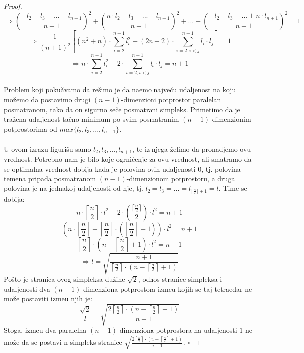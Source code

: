 \documentclass[11pt,letter]{article}
\begin{document}
\begin{proof}
$$\Rightarrow \left(\frac{-l_2-l_3-...-l_{n+1}}{n+1}\right)^2+\left(\frac{n\cdot l_2-l_3-...-l_{n+1}}{n+1}\right)^2+...+\left(\frac{-l_2-l_3-...+n\cdot l_{n+1}}{n+1}\right)^2=1$$
$$\Rightarrow \frac{1}{(n+1)^2}\left[ (n^2+n)\cdot {\sum_{i=2}^{n+1} {l_i^2}} - (2n+2)\cdot {\sum_{i=2, i<j}^{n+1} {l_i\cdot l_j} } \right]=1$$
$$\Rightarrow n\cdot {\sum_{i=2}^{n+1} {l_i^2}} - 2\cdot {\sum_{i=2,  i<j}^{n+1} {l_i\cdot l_j} } =n+1$$
\\
\indent Problem koji poku\v avamo da re\v simo je da na\dj emo najve\' cu udaljenost na koju mo\v zemo da postavimo drugi $(n-1)$-dimenzioni potprostor paralelan posmatranom, tako da on sigurno se\v ce posmatrani simpleks. Primetimo da je tra\v zena udaljenost ta\v cno minimum po svim posmatranim $(n-1)$-dimenzionim potprostorima od $max\{l_2, l_3,..., l_{n+1}\}$.
\\
\\
\indent U ovom izrazu figuri\v su samo $l_2, l_3,..., l_{n+1}$, te iz njega \v zelimo da pronadjemo ovu vrednost. Potrebno nam je bilo koje ogrni\v cenje za ovu vrednost, ali smatramo da se optimalna vrednost dobija kada je polovina ovih udaljenosti 0, tj. polovina temena pripada posmatranom $(n-1)$-dimenzionom potprostoru, a druga polovina je na jednakoj udaljenosti od nje, tj. $l_2=l_3=...=l_{\lceil \frac{n}{2}\rceil+1}=l$. Time se dobija:
$$n\cdot \left \lceil{\frac{n}{2}}\right \rceil\cdot l^2-2\cdot {{\lceil{\frac{n}{2}}\rceil}\choose {2}}\cdot l^2=n+1$$
$$\left( n\cdot \left \lceil \frac{n}{2} \right \rceil - {\left \lceil \frac{n}{2} \right\rceil} \cdot \left( \left \lceil \frac{n}{2}\right \rceil -1 \right) \right) \cdot l^2=n+1$$
$$\left \lceil \frac{n}{2} \right \rceil \cdot \left( n-\left \lceil \frac{n}{2}\right \rceil +1 \right)\cdot l^2=n+1$$
$$\Rightarrow l=\sqrt{\frac{n+1}{\left\lceil \frac{n}{2}\right\rceil \cdot \left( n-\left\lceil \frac{n}{2}\right\rceil+1\right)}}$$
Po\v sto je stranica ovog simpleksa du\v zine $\sqrt2$, odnos stranice simpleksa i udaljenosti dva $(n-1)$-dimenziona potprostora izme\dj u  kojih se taj tetraedar ne mo\v ze postaviti izme\dj u njih je:
$$\frac{\sqrt2}{l}=\sqrt{\frac{2\left\lceil \frac{n}{2}\right\rceil\cdot \left( n-\left\lceil\frac{n}{2}\right\rceil+1\right)}{n+1}}$$
Stoga, izme\dj u dva paralelna $(n-1)$-dimenziona potprostora na udaljenosti $1$ ne mo\v ze da se postavi n-simpleks stranice  $\sqrt{\frac{2\left\lceil \frac{n}{2}\right\rceil\cdot \left( n-\left\lceil\frac{n}{2}\right\rceil+1\right)}{n+1}}$.
$\square$
\end{proof}
\\
\smallskip
\\
\end{document}
